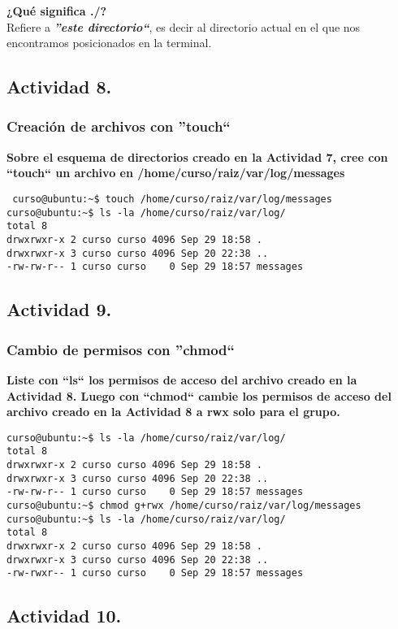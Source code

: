 \documentclass[a4paper,11pt,spanish]{article} %
\begin{document}
\textbf{¿Qué significa ./?}\\
Refiere a \textbf\emph{{''este directorio``}}, es decir al directorio actual en el que nos
encontramos posicionados en la terminal.

\subsection{Actividad 8.}

\subsubsection{Creación de archivos con ''touch``}
\textbf{Sobre el esquema de directorios creado en la Actividad 7, cree con
``touch`` un archivo en /home/curso/raiz/var/log/messages}

\begin{verbatim}
 curso@ubuntu:~$ touch /home/curso/raiz/var/log/messages
curso@ubuntu:~$ ls -la /home/curso/raiz/var/log/
total 8
drwxrwxr-x 2 curso curso 4096 Sep 29 18:58 .
drwxrwxr-x 3 curso curso 4096 Sep 20 22:38 ..
-rw-rw-r-- 1 curso curso    0 Sep 29 18:57 messages
\end{verbatim}

\subsection{Actividad 9.}

\subsubsection{Cambio de permisos con ''chmod``}
\textbf{Liste con ``ls`` los permisos de acceso del archivo creado en la Actividad 8.
Luego con ``chmod`` cambie los permisos de acceso del archivo creado en la Actividad 8 
a rwx solo para el grupo.}

\begin{verbatim}
curso@ubuntu:~$ ls -la /home/curso/raiz/var/log/
total 8
drwxrwxr-x 2 curso curso 4096 Sep 29 18:58 .
drwxrwxr-x 3 curso curso 4096 Sep 20 22:38 ..
-rw-rw-r-- 1 curso curso    0 Sep 29 18:57 messages
curso@ubuntu:~$ chmod g+rwx /home/curso/raiz/var/log/messages 
curso@ubuntu:~$ ls -la /home/curso/raiz/var/log/
total 8
drwxrwxr-x 2 curso curso 4096 Sep 29 18:58 .
drwxrwxr-x 3 curso curso 4096 Sep 20 22:38 ..
-rw-rwxr-- 1 curso curso    0 Sep 29 18:57 messages 
\end{verbatim}

\subsection{Actividad 10.}
\end{document}
